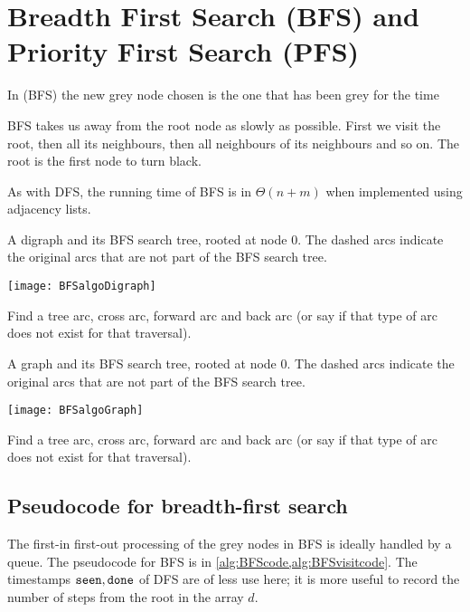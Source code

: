 \chapter{Breadth First Search (BFS) and Priority First Search (PFS)} %

\begin{Definition}
In  (BFS) the new grey node chosen is the one
that has been grey for the  time
\end{Definition}
 
BFS takes us away from the root node as slowly as possible. 
First we visit the root, then all its neighbours, then all neighbours of its neighbours and so on. 
The root is the first node to turn black.

As with DFS, the running time of BFS is in $\Theta(n+m)$ when implemented using adjacency lists.

\begin{Boxample}[2]
A digraph and its BFS search tree, rooted at node $0$. The dashed arcs indicate the original arcs that are not part of the BFS search tree.
\begin{center}
\texttt{[image: BFSalgoDigraph]} 
\end{center}
Find a tree arc, cross arc, forward arc and back arc (or say if that type of arc does not exist for that traversal).
\end{Boxample}

\begin{Boxample}[2]
A graph and its BFS search tree, rooted at node $0$. The dashed arcs indicate the original arcs that are not part of the BFS search tree.
\begin{center}
\texttt{[image: BFSalgoGraph]}
\end{center}
Find a tree arc, cross arc, forward arc and back arc (or say if that type of arc does not exist for that traversal).
\end{Boxample}

 
\section{Pseudocode for breadth-first search}
\label{sec:bfs}
The first-in first-out processing of the grey nodes in BFS is ideally handled by a queue. 
The pseudocode for BFS is in \cref{alg:BFScode,alg:BFSvisitcode}.
The timestamps $\seen, \done$ of DFS are of less use here;
it is more useful to record the number of steps from the root in the array $d$.


